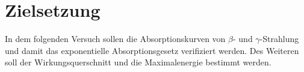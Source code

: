 \section{Zielsetzung}
In dem folgenden Versuch sollen die Absorptionskurven von $\beta$- und $\gamma$-Strahlung und damit das exponentielle Absorptionsgesetz verifiziert werden. Des Weiteren soll der Wirkungsquerschnitt und die Maximalenergie bestimmt werden.